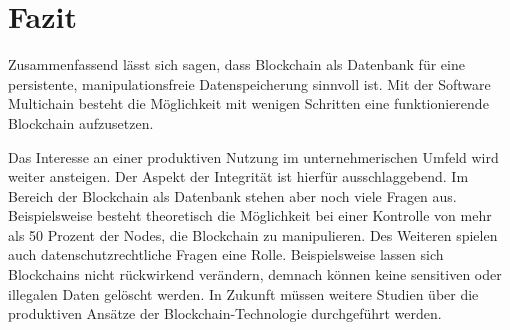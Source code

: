 \section{Fazit}
\label{sec:Fazit}
Zusammenfassend lässt sich sagen, dass Blockchain als Datenbank für eine persistente, manipulationsfreie Datenspeicherung sinnvoll ist. Mit der Software Multichain besteht die Möglichkeit mit wenigen Schritten eine funktionierende Blockchain aufzusetzen.

Das Interesse an einer produktiven Nutzung im unternehmerischen Umfeld wird weiter ansteigen. Der Aspekt der Integrität ist hierfür ausschlaggebend. Im Bereich der Blockchain als Datenbank stehen aber noch viele Fragen aus. Beispielsweise besteht theoretisch die Möglichkeit bei einer Kontrolle von mehr als 50 Prozent der Nodes, die Blockchain zu manipulieren. Des Weiteren spielen auch datenschutzrechtliche Fragen eine Rolle. Beispielsweise lassen sich Blockchains nicht rückwirkend verändern, demnach können keine sensitiven oder illegalen Daten gelöscht werden. In Zukunft müssen weitere Studien über die produktiven Ansätze der Blockchain-Technologie durchgeführt werden.